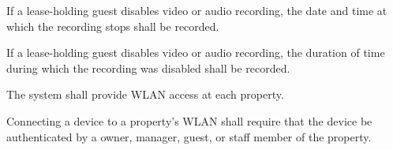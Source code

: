 \documentclass[letter,titlepage,oneside,english]{report}
\begin{document}
\begin{fr}
\begin{fr}
\begin{fr}
    \item
      If a lease-holding guest disables video or audio recording, the date and time at which the recording stops shall be recorded.
    \item
      If a lease-holding guest disables video or audio recording, the duration of time during which the recording was disabled shall be recorded.
    \end{fr}
  \end{fr}
\item
  The system shall provide WLAN access at each property.
  \begin{fr}
  \item
    Connecting a device to a property's WLAN shall require that the device be authenticated by a owner, manager, guest, or staff member of the property.
  \end{fr}
\end{fr}
\end{document}
